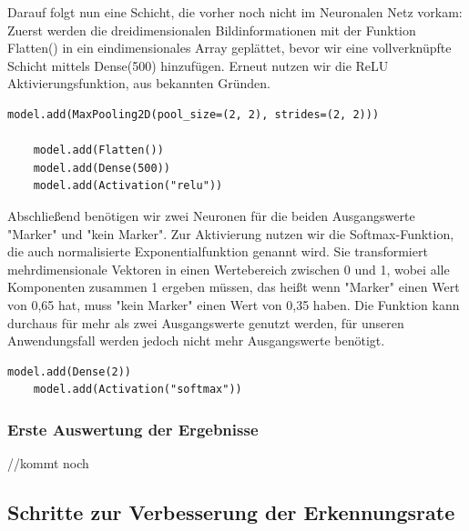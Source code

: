 \documentclass[conference]{IEEEtran}
\begin{document}
Darauf folgt nun eine Schicht, die vorher noch nicht im Neuronalen Netz vorkam:
Zuerst werden die dreidimensionalen Bildinformationen mit der Funktion Flatten() in ein eindimensionales Array geplättet, bevor wir eine vollverknüpfte Schicht mittels Dense(500) hinzufügen.
Erneut nutzen wir die ReLU Aktivierungsfunktion, aus bekannten Gründen.

\begin{lstlisting}[label={list:model_1_3},caption=Modell: vierte und fünfte Schicht]
	model.add(MaxPooling2D(pool_size=(2, 2), strides=(2, 2)))

	model.add(Flatten())
	model.add(Dense(500))
	model.add(Activation("relu"))
\end{lstlisting}

Abschließend benötigen wir zwei Neuronen für die beiden Ausgangswerte "Marker" und "kein Marker".
Zur Aktivierung nutzen wir die Softmax-Funktion, die auch normalisierte Exponentialfunktion genannt wird.
Sie transformiert mehrdimensionale Vektoren in einen Wertebereich zwischen 0 und 1, wobei alle Komponenten zusammen 1 ergeben müssen, das heißt wenn "Marker" einen Wert von 0,65 hat, muss "kein Marker" einen Wert von 0,35 haben. 
Die Funktion kann durchaus für mehr als zwei Ausgangswerte genutzt werden, für unseren Anwendungsfall werden jedoch nicht mehr Ausgangswerte benötigt.

\begin{lstlisting}[label={list:model_1_4},caption=Modell: finale sechste Schicht]
	model.add(Dense(2))
	model.add(Activation("softmax"))
\end{lstlisting}

\subsubsection{Erste Auswertung der Ergebnisse}	%
//kommt noch
\subsection{Schritte zur Verbesserung der Erkennungsrate} %
\end{document}
